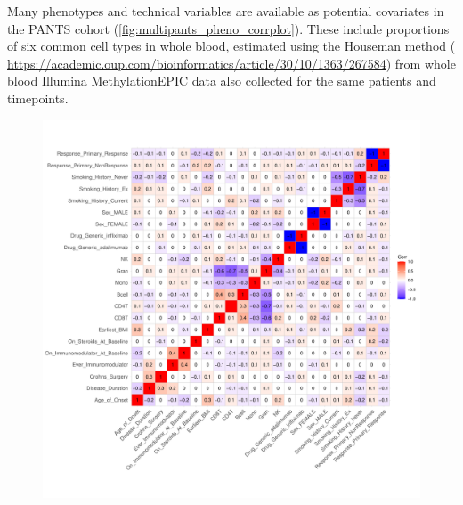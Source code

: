 \begin{outline}
Many phenotypes and technical variables are available as potential covariates in the \gls{PANTS} cohort (\autoref{fig:multipants_pheno_corrplot}).
These include proportions of six common cell types in whole blood, 
estimated using the Houseman method ( \url{https://academic.oup.com/bioinformatics/article/30/10/1363/267584}) 
from whole blood Illumina MethylationEPIC data also collected for the same patients and timepoints.

\begin{figure}
    \centering
    \includegraphics[width=1.0\textwidth,page=1]{mainmatter/figures/chapter_04/process_pheno.pheno_filtered_dge.ggcorrplot.pdf}
    \caption{}
    \label{fig:multipants_pheno_corrplot}
\end{figure}


\end{outline}
